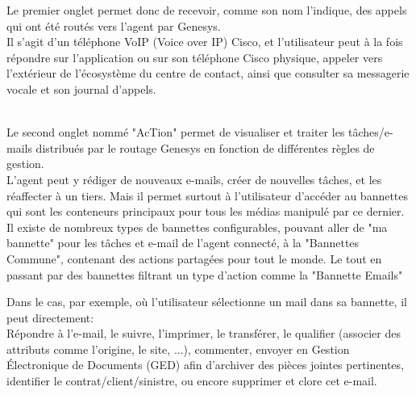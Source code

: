 \documentclass{rapport}
\begin{document}
\vspace{5mm} %
\begin{minipage}{0.65\textwidth}
Le premier onglet permet donc de recevoir, comme son nom l'indique, des appels qui ont été routés vers l'agent par Genesys. \\

Il s'agit d'un téléphone VoIP (Voice over IP) Cisco, et l'utilisateur peut à la fois répondre sur l'application ou sur son téléphone Cisco physique, appeler vers l'extérieur de l'écosystème du centre de contact, ainsi que consulter sa messagerie vocale et son journal d'appels.\\

\end{minipage}
\begin{minipage}{0.25\textwidth}
\end{minipage}
\vspace{5mm} %
\noindent
\\

Le second onglet nommé "AcTion" permet de visualiser et traiter les tâches/e-mails distribués par le routage Genesys en fonction de différentes règles de gestion.\\

L'agent peut y rédiger de nouveaux e-mails, créer de nouvelles tâches, et les réaffecter à un tiers. Mais il permet surtout à l'utilisateur d'accéder au bannettes qui sont les conteneurs principaux pour tous les médias manipulé par ce dernier. \\
Il existe de nombreux types de bannettes configurables, pouvant aller de "ma bannette" pour les tâches et e-mail de l'agent connecté, à la "Bannettes Commune", contenant des actions partagées pour tout le monde. Le tout en passant par des bannettes filtrant un type d'action comme la "Bannette Emails"\\



Dans le cas, par exemple, où l'utilisateur sélectionne un mail dans sa bannette, il peut directement:\\
Répondre à l'e-mail, le suivre, l'imprimer, le transférer, le qualifier (associer des attributs comme l'origine, le site, ...), commenter, envoyer en Gestion Électronique de Documents (GED) afin d'archiver des pièces jointes pertinentes, identifier le contrat/client/sinistre, ou encore supprimer et clore cet e-mail.\\
\end{document}
